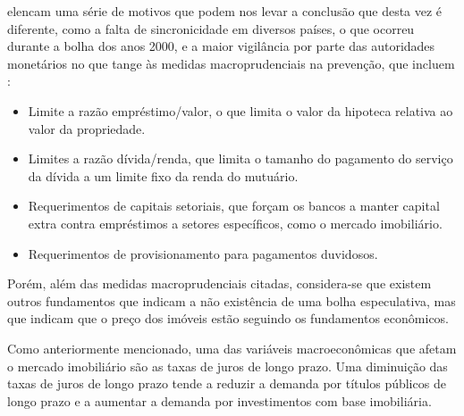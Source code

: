 \documentclass[
	12pt,				%
	oneside,			%
	a4paper,			%
	chapter=TITLE,		%
	section=TITLE,		%
	english,			%
	brazil				%
	]{abntex2}
\begin{document}
\textcite{fmitwa} elencam uma série de motivos que podem nos levar a
conclusão que desta vez é diferente, como a falta de sincronicidade em
diversos países, o que ocorreu durante a bolha dos anos 2000, e a maior
vigilância por parte das autoridades monetários no que tange às medidas
macroprudenciais na prevenção, que incluem \autocite{fmiem}:
\begin{itemize}
\tightlist
\item
  Limite a razão empréstimo/valor, o que limita o valor da hipoteca
  relativa ao valor da propriedade.
\item
  Limites a razão dívida/renda, que limita o tamanho do pagamento do
  serviço da dívida a um limite fixo da renda do mutuário.
\item
  Requerimentos de capitais setoriais, que forçam os bancos a manter
  capital extra contra empréstimos a setores específicos, como o mercado
  imobiliário.
\item
  Requerimentos de provisionamento para pagamentos duvidosos.
\end{itemize}
Porém, além das medidas macroprudenciais citadas, considera-se que
existem outros fundamentos que indicam a não existência de uma bolha
especulativa, mas que indicam que o preço dos imóveis estão seguindo os
fundamentos econômicos.

Como anteriormente mencionado, uma das variáveis macroeconômicas que
afetam o mercado imobiliário são as taxas de juros de longo prazo. Uma
diminuição das taxas de juros de longo prazo tende a reduzir a demanda
por títulos públicos de longo prazo e a aumentar a demanda por
investimentos com base imobiliária.
\end{document}
